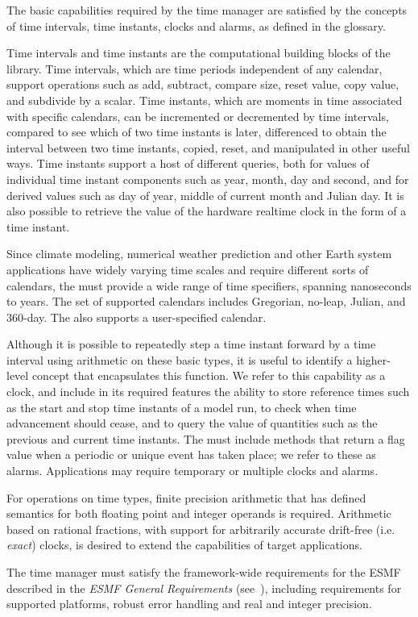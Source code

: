 
The basic capabilities required by the time manager are satisfied by
the concepts of time intervals, time instants, clocks and alarms, as defined 
in the glossary.  

Time intervals and time instants are the computational building blocks of the \funcname 
library.  Time intervals, which are time periods independent of any calendar, support 
operations such as add, subtract, compare size, reset value, copy value, and 
subdivide by a scalar.  Time instants, which are moments in time associated 
with specific calendars, can be incremented or decremented by time intervals, compared 
to see which of two time instants is later, differenced to obtain the interval
between two time instants, copied, reset, and manipulated in other useful ways.
Time instants support a host of different queries, both for values of individual time instant 
components such as year, month, day and second, and for derived values such 
as day of year, middle of current month and Julian day.  It is also possible 
to retrieve the value of the hardware realtime clock in the form of a time instant.

Since climate modeling, numerical weather prediction and other 
Earth system applications have widely varying time scales and require different sorts
of calendars, the \funcname must provide a wide range of time specifiers, spanning 
nanoseconds to years.  The set of supported calendars includes Gregorian, no-leap,
Julian, and 360-day.  The \funcname also supports a user-specified calendar.

Although it is possible to repeatedly step a time instant forward by a time interval using 
arithmetic on these basic types, it is useful to identify a higher-level concept 
that encapsulates this function.  We refer to this capability as a clock, and include 
in its required features the ability to store reference times such as the start and
stop time instants of a model run, to check when time advancement should cease, and to query 
the value of quantities such as the previous and current time instants.  The \funcname 
must include methods that return a flag value when a periodic or unique event has taken 
place; we refer to these as alarms.  Applications may require temporary 
or multiple clocks and alarms.  

For operations on time types, finite precision arithmetic that has defined semantics 
for both floating point and integer operands is required. Arithmetic based on rational 
fractions, with support for arbitrarily accurate drift-free 
(i.e. {\it exact}) clocks, is desired to extend the capabilities of target
applications.

The time manager must satisfy the framework-wide requirements for the ESMF described 
in the {\it ESMF General Requirements} (see~\cite{ESMFGenReq}), including requirements for 
supported platforms, robust error handling and real and integer precision.

















